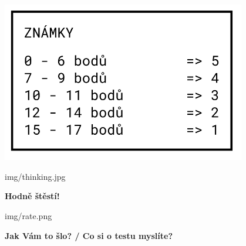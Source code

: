 \documentclass[aspectratio=169]{beamer}
\begin{document}
\begin{frame}
    \begin{center}
        \includegraphics[width=0.8\textwidth]{img/test-1-hodnoceni.png}
    \end{center}
\end{frame}


\begin{frameImg}[width]{img/thinking.jpg}
    \vspace*{60mm}
    \begin{cardTiny}
        \vspace*{\fill}
        \begin{center}
            \textbf{Hodně štěstí!}
        \end{center}
    \end{cardTiny}
\end{frameImg}

\begin{frameImg}[width]{img/rate.png}
    \vspace*{60mm}
    \begin{cardTiny}
        \vspace*{\fill}
        \begin{center}
            \textbf{Jak Vám to šlo? / Co si o testu myslíte?}
        \end{center}
    \end{cardTiny}
\end{frameImg}
\end{document}
